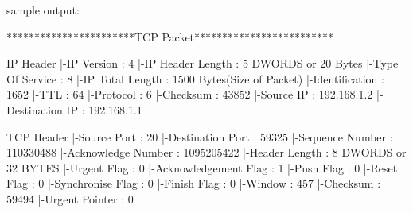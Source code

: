\begin{chunk}{sample output:}

***********************TCP Packet*************************

IP Header
   |-IP Version        : 4
   |-IP Header Length  : 5 DWORDS or 20 Bytes
   |-Type Of Service   : 8
   |-IP Total Length   : 1500  Bytes(Size of Packet)
   |-Identification    : 1652
   |-TTL      : 64
   |-Protocol : 6
   |-Checksum : 43852
   |-Source IP        : 192.168.1.2
   |-Destination IP   : 192.168.1.1

TCP Header
   |-Source Port      : 20
   |-Destination Port : 59325
   |-Sequence Number    : 110330488
   |-Acknowledge Number : 1095205422
   |-Header Length      : 8 DWORDS or 32 BYTES
   |-Urgent Flag          : 0
   |-Acknowledgement Flag : 1
   |-Push Flag            : 0
   |-Reset Flag           : 0
   |-Synchronise Flag     : 0
   |-Finish Flag          : 0
   |-Window         : 457
   |-Checksum       : 59494
   |-Urgent Pointer : 0


\end{chunk}
